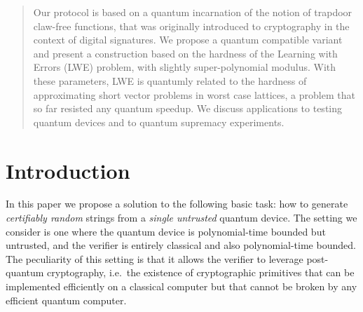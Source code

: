 \documentclass[11pt]{article}
\theoremstyle{remark}
\theoremstyle{definition}
\begin{document}
\begin{abstract}
Our protocol is based on a quantum incarnation of the notion of trapdoor claw-free functions, that was originally introduced to cryptography in the context of digital signatures. We propose a quantum compatible variant and present a construction based on the hardness of the Learning with Errors (LWE) problem, with slightly super-polynomial modulus. With these parameters, LWE is quantumly related to the hardness of approximating short vector problems in worst case lattices, a problem that so far resisted any quantum speedup. We discuss applications to testing quantum devices and to quantum supremacy experiments.

%
%
%
\end{abstract}

\section{Introduction}

In this paper we propose a solution to the following basic task: how to generate \emph{certifiably random} strings from a \emph{single untrusted} quantum device. The setting we consider is one where the quantum device is polynomial-time bounded but untrusted, and the verifier is entirely classical and also polynomial-time bounded. The peculiarity of this setting is that it allows the verifier to leverage post-quantum cryptography, i.e.\ the existence of cryptographic primitives that can be implemented efficiently on a classical computer but that cannot be broken by any efficient quantum computer. 
\end{document}
